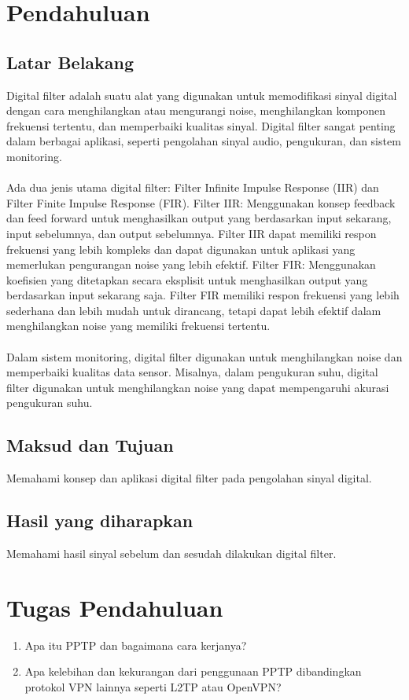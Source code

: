 \section{Pendahuluan}
\subsection{Latar Belakang}
Digital filter adalah suatu alat yang digunakan untuk memodifikasi sinyal digital dengan cara menghilangkan atau mengurangi noise, menghilangkan komponen frekuensi tertentu, dan memperbaiki kualitas sinyal. 
Digital filter sangat penting dalam berbagai aplikasi, seperti pengolahan sinyal audio, pengukuran, dan sistem monitoring.
\\\\
Ada dua jenis utama digital filter: Filter Infinite Impulse Response (IIR) dan Filter Finite Impulse Response (FIR).
Filter IIR: Menggunakan konsep feedback dan feed forward untuk menghasilkan output yang berdasarkan input sekarang, input sebelumnya, dan output sebelumnya. Filter IIR dapat memiliki respon frekuensi yang lebih kompleks dan dapat digunakan untuk aplikasi yang memerlukan pengurangan noise yang lebih efektif.
Filter FIR: Menggunakan koefisien yang ditetapkan secara eksplisit untuk menghasilkan output yang berdasarkan input sekarang saja. Filter FIR memiliki respon frekuensi yang lebih sederhana dan lebih mudah untuk dirancang, tetapi dapat lebih efektif dalam menghilangkan noise yang memiliki frekuensi tertentu.
\\\\
Dalam sistem monitoring, digital filter digunakan untuk menghilangkan noise dan memperbaiki kualitas data sensor. 
Misalnya, dalam pengukuran suhu, digital filter digunakan untuk menghilangkan noise yang dapat mempengaruhi akurasi pengukuran suhu. 

\subsection{Maksud dan Tujuan}
Memahami konsep dan aplikasi digital filter pada pengolahan sinyal digital.
\subsection{Hasil yang diharapkan}
Memahami hasil sinyal sebelum dan sesudah dilakukan digital filter.

\section{Tugas Pendahuluan}
\begin{center}
	\colorbox{cyan!30}{\parbox{0.8\linewidth}{
    \begin{enumerate}
        \item Apa itu PPTP dan bagaimana cara kerjanya?
        \item Apa kelebihan dan kekurangan dari penggunaan PPTP dibandingkan protokol VPN lainnya seperti L2TP atau OpenVPN?
    \end{enumerate}}}
\end{center}

